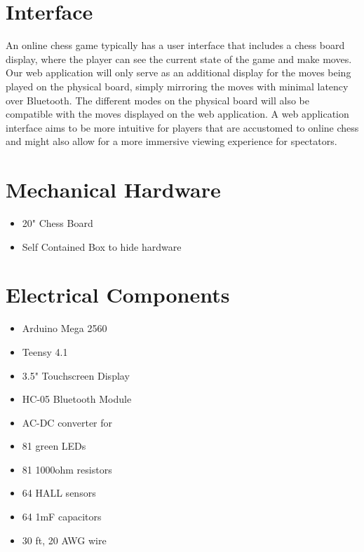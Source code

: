 \documentclass[12pt, titlepage]{article}
\begin{document}
% 

\newpage{}

\appendix

\section{Interface}
An online chess game typically has a user interface that includes a chess 
board display, where the player can see the current state of the game and make
 moves. Our web application will only serve as an additional display for the 
 moves being played on the physical board, simply mirroring the moves with 
 minimal latency over Bluetooth. The different modes on the physical board 
 will also be compatible with the moves displayed on the web application. A 
 web application interface aims to be more intuitive for players that are 
 accustomed to online chess and might also allow for a more immersive viewing
 experience for spectators.


\section{Mechanical Hardware}
\begin{itemize}
  \item 20" Chess Board
  \item Self Contained Box to hide hardware
\end{itemize}

\section{Electrical Components}
\begin{itemize}
  \item Arduino Mega 2560
  \item Teensy 4.1 
  \item 3.5" Touchscreen Display
  \item HC-05 Bluetooth Module
  \item AC-DC converter for 
  \item 81 green LEDs
  \item 81 1000ohm resistors
  \item 64 HALL sensors
  \item 64 1mF capacitors
  \item 30 ft, 20 AWG wire
\end{itemize}
\end{document}
